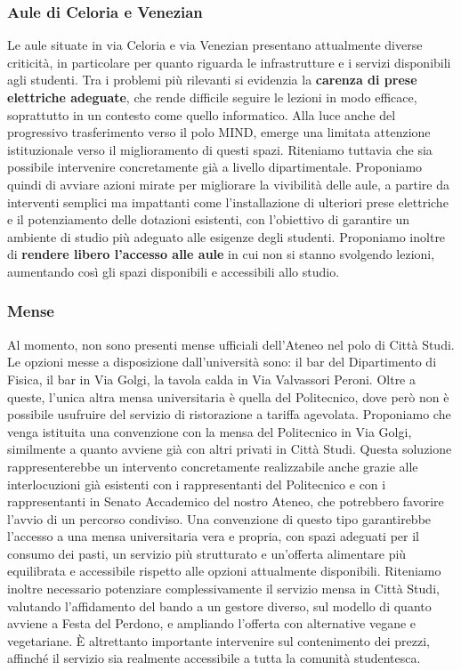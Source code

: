 \documentclass[12pt,a4paper]{article}
\begin{document}
\subsubsection{Aule di Celoria e Venezian}
Le aule situate in via Celoria e via Venezian presentano attualmente diverse criticità, in particolare per quanto riguarda le infrastrutture e i servizi disponibili agli studenti. Tra i problemi più rilevanti si evidenzia la \textbf{carenza di prese elettriche adeguate}, che rende difficile seguire le lezioni in modo efficace, soprattutto in un contesto come quello informatico.
Alla luce anche del progressivo trasferimento verso il polo MIND, emerge una limitata attenzione istituzionale verso il miglioramento di questi spazi. Riteniamo tuttavia che sia possibile intervenire concretamente già a livello dipartimentale.
Proponiamo quindi di avviare azioni mirate per migliorare la vivibilità delle aule, a partire da interventi semplici ma impattanti come l’installazione di ulteriori prese elettriche e il potenziamento delle dotazioni esistenti, con l’obiettivo di garantire un ambiente di studio più adeguato alle esigenze degli studenti.
Proponiamo inoltre di \textbf{rendere libero l'accesso alle aule} in cui non si stanno svolgendo lezioni, aumentando così gli spazi disponibili e accessibili allo studio.

\subsubsection{Mense}
Al momento, non sono presenti mense ufficiali dell'Ateneo nel polo di Città Studi. Le opzioni messe a disposizione dall'università sono:
il bar del Dipartimento di Fisica, il bar in Via Golgi, la tavola calda in Via Valvassori Peroni. Oltre a queste, l'unica altra mensa universitaria è quella del Politecnico, dove però non è possibile usufruire del servizio di ristorazione a tariffa agevolata.
Proponiamo che venga istituita una convenzione con la mensa del Politecnico in Via Golgi, similmente a quanto avviene già con altri privati in Città Studi. Questa soluzione rappresenterebbe un intervento concretamente realizzabile anche grazie alle interlocuzioni già esistenti con i rappresentanti del Politecnico e con i rappresentanti in Senato Accademico del nostro Ateneo, che potrebbero favorire l’avvio di un percorso condiviso. Una convenzione di questo tipo garantirebbe l’accesso a una mensa universitaria vera e propria, con spazi adeguati per il consumo dei pasti, un servizio più strutturato e un’offerta alimentare più equilibrata e accessibile rispetto alle opzioni attualmente disponibili.
Riteniamo inoltre necessario potenziare complessivamente il servizio mensa in Città Studi, valutando l’affidamento del bando a un gestore diverso, sul modello di quanto avviene a Festa del Perdono, e ampliando l’offerta con alternative vegane e vegetariane. È altrettanto importante intervenire sul contenimento dei prezzi, affinché il servizio sia realmente accessibile a tutta la comunità studentesca.
\end{document}
